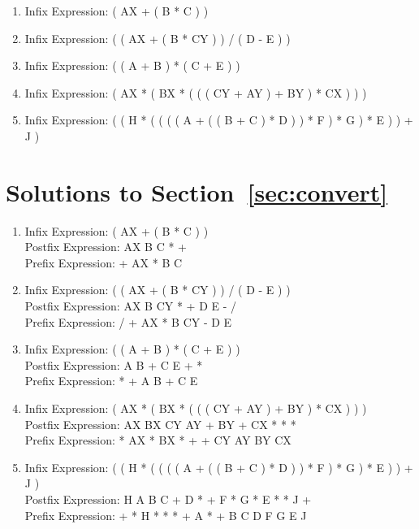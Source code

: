 \documentclass[11pt,letterpaper]{article}
\begin{document}
\begin{enumerate}
\item Infix Expression: ( AX + ( B * C ) ) 

\item Infix Expression: ( ( AX + ( B * CY ) ) / ( D - E ) )

\item Infix Expression: ( ( A + B ) * ( C + E ) ) 

\item Infix Expression: ( AX * ( BX * ( ( ( CY + AY ) + BY ) * CX ) ) ) 

\item Infix Expression: ( ( H * ( ( ( ( A + ( ( B + C ) * D ) ) * F ) * G ) * E ) ) + J )
\end{enumerate}

\newpage
\section{Solutions to Section~\ref{sec:convert}}

\begin{enumerate}
\item
Infix Expression: ( AX + ( B * C ) ) 
\\
Postfix Expression: AX B C * +
\\
Prefix Expression: + AX * B C

\item
Infix Expression: ( ( AX + ( B * CY ) ) / ( D - E ) )
\\
Postfix Expression: AX B CY * + D E - /
\\
Prefix Expression: / + AX * B CY - D E

\item
Infix Expression: ( ( A + B ) * ( C + E ) ) 
\\
Postfix Expression: A B + C E + *
\\
Prefix Expression: * + A B + C E

\item
Infix Expression: ( AX * ( BX * ( ( ( CY + AY ) + BY ) * CX ) ) ) 
\\
Postfix Expression: AX BX CY AY + BY + CX * * *
\\
Prefix Expression: * AX * BX * + + CY AY BY CX

\item
Infix Expression: ( ( H * ( ( ( ( A + ( ( B + C ) * D ) ) * F ) * G ) * E ) ) + J ) 
\\
Postfix Expression: H A B C + D * + F * G * E * * J +
\\
Prefix Expression: + * H * * * + A * + B C D F G E J
\end{enumerate}
\end{document}
